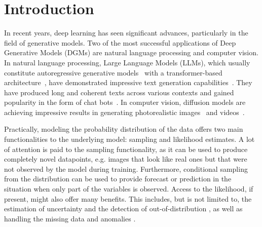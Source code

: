 \chapter{Introduction}\label{chap:intro}



In recent years, deep learning has seen significant advances, particularly in the field of generative models. Two of the most successful applications of Deep Generative Models (DGMs) are natural language processing and computer vision. In natural language processing, Large Language Models (LLMs), which usually constitute autoregressive generative models~\citep{graves2013generating} with a transformer-based architecture~\citep{vaswani2017attention}, have demonstrated impressive text generation capabilities~\citep{brown2020language,chowdhery2023palm}. They have produced long and coherent texts across various contexts and gained popularity in the form of chat bots~\citep{achiam2023gpt}. In computer vision, diffusion models are achieving impressive results in generating photorealistic images~\citep{dhariwal2021diffusion} and videos~\citep{ho2022video}.


Practically, modeling the probability distribution of the data offers two main functionalities to the underlying model: sampling and likelihood estimates. A lot of attention is paid to the sampling functionality, as it can be used to produce completely novel datapoints, e.g. images that look like real ones but that were not observed by the model during training. Furthermore, conditional sampling from the distribution can be used to provide forecast or prediction in the situation when only part of the variables is observed. Access to the likelihood, if present, might also offer many benefits. This includes, but is not limited to, the estimation of uncertainty and the detection of out-of-distribution \cite{havtorn2021hierarchical, kadavath2022language}, as well as handling the missing data \cite{mattei2019miwae} and anomalies \citep{an2015variational}.

